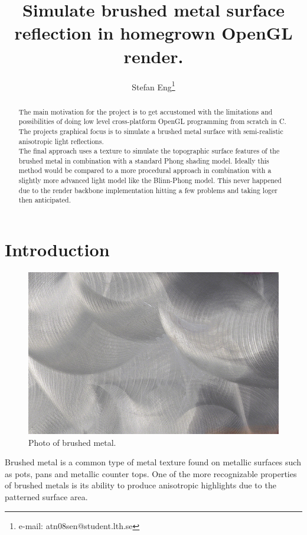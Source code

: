 \documentclass{acmsiggraph}               %
\title{Simulate brushed metal surface reflection in homegrown OpenGL render.}
\author{Stefan Eng\thanks{e-mail: atn08sen@student.lth.se}
}
\affiliation{Lund University\\ Sweden}
\begin{document}
\ifpdf
\else
\fi


\maketitle

\begin{abstract}
The main motivation for the project is to get accustomed with the limitations
and possibilities of doing low level cross-platform OpenGL programming from scratch in C. The projects
graphical focus is to simulate a brushed metal surface with semi-realistic
anisotropic light reflections. \\

The final approach uses a texture to simulate the
topographic surface features of the brushed metal in combination with a
standard Phong shading model\cite{wiki_phong}.
Ideally this method would be compared to a more procedural approach in
combination with a slightly more advanced light model like the Blinn-Phong
model\cite{wiki_blinn}. This never happened due to the render backbone
implementation hitting a few problems and taking loger then anticipated.

\end{abstract}


\section{Introduction}

\begin{figure}[!ht]
    \centering
    \includegraphics[width=0.7\columnwidth]{brushed.jpg}
    \caption{Photo of brushed metal.}
    \label{brushed_real}
\end{figure}

Brushed metal is a common type of metal texture found on metallic surfaces such
as pots, pans and metallic counter tops. One of the more
recognizable properties of brushed metals is its ability to produce anisotropic
highlights due to the patterned surface area. \\
\end{document}

